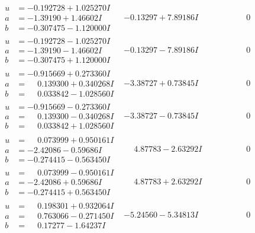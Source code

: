 \documentclass[1p]{elsarticle_modified}
\theoremstyle{definition}
\begin{document}
$$\begin{array}{c|c|c}
\begin{aligned}
u &= -0.192728 + 1.025270 I \\
a &= -1.39190 + 1.46602 I \\
b &= -0.307475 - 1.120000 I\end{aligned}
 & -0.13297 + 7.89186 I & \phantom{-0.000000 } 0 \\ \hline\begin{aligned}
u &= -0.192728 - 1.025270 I \\
a &= -1.39190 - 1.46602 I \\
b &= -0.307475 + 1.120000 I\end{aligned}
 & -0.13297 - 7.89186 I & \phantom{-0.000000 } 0 \\ \hline\begin{aligned}
u &= -0.915669 + 0.273360 I \\
a &= \phantom{-}0.139300 + 0.340268 I \\
b &= \phantom{-}0.033842 - 1.028560 I\end{aligned}
 & -3.38727 + 0.73845 I & \phantom{-0.000000 } 0 \\ \hline\begin{aligned}
u &= -0.915669 - 0.273360 I \\
a &= \phantom{-}0.139300 - 0.340268 I \\
b &= \phantom{-}0.033842 + 1.028560 I\end{aligned}
 & -3.38727 - 0.73845 I & \phantom{-0.000000 } 0 \\ \hline\begin{aligned}
u &= \phantom{-}0.073999 + 0.950161 I \\
a &= -2.42086 - 0.59686 I \\
b &= -0.274415 - 0.563450 I\end{aligned}
 & \phantom{-}4.87783 - 2.63292 I & \phantom{-0.000000 } 0 \\ \hline\begin{aligned}
u &= \phantom{-}0.073999 - 0.950161 I \\
a &= -2.42086 + 0.59686 I \\
b &= -0.274415 + 0.563450 I\end{aligned}
 & \phantom{-}4.87783 + 2.63292 I & \phantom{-0.000000 } 0 \\ \hline\begin{aligned}
u &= \phantom{-}0.198301 + 0.932064 I \\
a &= \phantom{-}0.763066 - 0.271450 I \\
b &= \phantom{-}0.17277 - 1.64237 I\end{aligned}
 & -5.24560 - 5.34813 I & \phantom{-0.000000 } 0 \\ \hline\begin{aligned}

\end{aligned}
\end{array}$$
\end{document}
